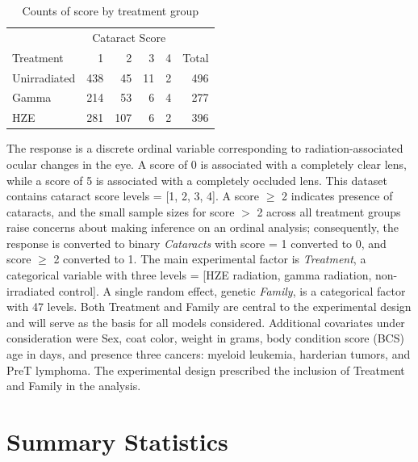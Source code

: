 \documentclass[12pt]{article}
\begin{document}
\begin{table}
\centering
\begin{tabular}{lrrrrr}
  \toprule
\multicolumn{1}{c}{ } & \multicolumn{4}{c}{Cataract Score} & \multicolumn{1}{c}{ } \\
\cmidrule(l{3pt}r{3pt}){2-5}
Treatment & 1 & 2 & 3 & 4 & Total \\ 
  \midrule
Unirradiated & 438 &  45 &  11 &   2 & 496 \\ 
  Gamma & 214 &  53 &   6 &   4 & 277 \\ 
  HZE & 281 & 107 &   6 &   2 & 396 \\ 
   \bottomrule
\end{tabular}
\caption{Counts of score by treatment group} 
\end{table}

The response is a discrete ordinal variable corresponding to radiation-associated ocular changes in the eye. A score of 0 is associated with a completely clear lens, while a score of 5 is associated with a completely occluded lens. This dataset contains cataract score levels = {[}1, 2, 3, 4{]}. A score \(\ge\) 2 indicates presence of cataracts, and the small sample sizes for score \(>\) 2 across all treatment groups raise concerns about making inference on an ordinal analysis; consequently, the response is converted to binary \emph{Cataracts} with score = 1 converted to 0, and score \(\ge\) 2 converted to 1. The main experimental factor is \emph{Treatment}, a categorical variable with three levels = {[}HZE radiation, gamma radiation, non-irradiated control{]}. A single random effect, genetic \emph{Family}, is a categorical factor with 47 levels. Both Treatment and Family are central to the experimental design and will serve as the basis for all models considered. Additional covariates under consideration were Sex, coat color, weight in grams, body condition score (BCS) age in days, and presence three cancers: myeloid leukemia, harderian tumors, and PreT lymphoma. The experimental design prescribed the inclusion of Treatment and Family in the analysis.

\section{Summary Statistics}
\label{sec:sumstats}
\end{document}
